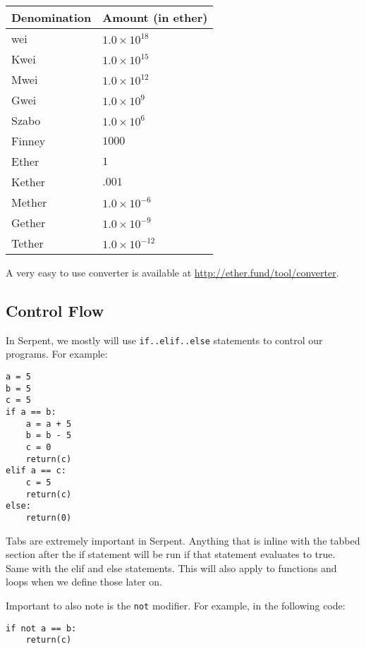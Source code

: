 \documentclass[12pt]{article}
\begin{document}
\begin{center}
	\begin{tabular}{| l | p{3.5cm} |}
	\hline
	Denomination & Amount (in ether) \\ \hline
	wei & $1.0 \times 10^{18}$ \\ \hline
	Kwei & $1.0 \times 10^{15}$ \\ \hline
	Mwei & $1.0 \times 10^{12}$ \\ \hline
	Gwei & $1.0 \times 10^{9}$ \\ \hline
	Szabo & $1.0 \times 10^{6}$ \\ \hline
	Finney & $1000$ \\ \hline
	Ether & $1$ \\ \hline
	Kether & $.001$ \\ \hline
	Mether & $1.0 \times 10^{-6}$ \\ \hline
	Gether & $1.0 \times 10^{-9}$ \\ \hline
	Tether & $1.0 \times 10^{-12}$ \\ \hline
	\end{tabular}
\end{center}

A very easy to use converter is available at \url{http://ether.fund/tool/converter}. 

\subsection{Control Flow}

	In Serpent, we mostly will use \texttt{if..elif..else} statements to control our programs. For example:
	
\begin{verbatim}
a = 5
b = 5
c = 5
if a == b:
	a = a + 5
	b = b - 5
	c = 0
	return(c)
elif a == c: 
	c = 5
	return(c)
else:
	return(0)
\end{verbatim}

	Tabs are extremely important in Serpent. Anything that is inline with the tabbed section after the if statement will be run if that statement evaluates to true. Same with the elif and else statements. This will also apply to functions and loops when we define those later on. \cite{Serpent}
	
	Important to also note is the \texttt{not} modifier. For example, in the following code:
	
\begin{verbatim}
if not a == b:
	return(c)
\end{verbatim}
\end{document}
